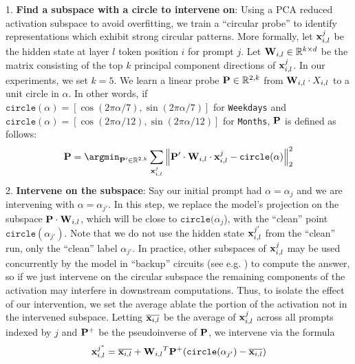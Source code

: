 \documentclass{article} %
\DeclareRobustCommand{\revOne}[1]{#1}
\theoremstyle{plain}
\theoremstyle{definition}
\newcommand{\josh}[1]{{\color{orange}{\bf Josh:} #1}}
\begin{document}
1. \textbf{Find a subspace with a circle to intervene on}: Using a PCA reduced activation subspace to avoid overfitting, we train a ``circular probe'' to identify representations which exhibit strong circular patterns. More formally, let $\x^j_{i, l}$ be the hidden state at layer $l$ token position $i$ for prompt $j$. Let $\W_{i, l} \in \mathbb{R}^{k \times d}$ be the matrix consisting of the top $k$ principal component directions of $\x^j_{i, l}$. In our experiments, we set $k = 5$. We learn a linear probe $\P \in \mathbb{R}^{2, k}$ from $\W_{i, l} \cdot X_{i, l}$ to a unit circle in $\alpha$. In other words, if $\texttt{circle}(\alpha) = [\cos(2 \pi \alpha/7), \sin(2 \pi \alpha/7)]$ for \texttt{Weekdays} and $\texttt{circle}(\alpha) = [\cos(2 \pi \alpha / 12), \sin(2 \pi \alpha / 12)]$ for \texttt{Months}, $\P$ is defined as follows:
\begin{align}
\label{eqn:circle_probe}
\P = \argmin_{ \P' \in \mathbb{R}^{2, k}} \sum_{\x^j_{i, l}}\left\lVert \P' \cdot \W_{i, l} \cdot \x^j_{i, l} - \texttt{circle}(\alpha) \right\rVert_2^2  
\end{align}
2. \textbf{Intervene on the subspace}: Say our initial prompt had $\alpha = \alpha_j$ and we are intervening with $\alpha = \alpha_{j'}$. In this step, we replace the model's projection on the subspace $\P \cdot \W_{i,l}$, which will be close to $\texttt{circle}(\alpha_j$), with the ``clean'' point $\texttt{circle}(\alpha_{j'})$. Note that we do not use the hidden state $\x^{j'}_{i, l}$ from the ``clean'' run, only the ``clean'' label $\alpha_{j'}$. \revOne{In practice, other subspaces of $\x^j_{i, l}$ may be used concurrently by the model in ``backup'' circuits (see e.g. \cite{gpt2_ioi}) to compute the answer, so if we just intervene on the circular subspace the remaining components of the activation may interfere in downstream computations. Thus, to isolate the effect of our intervention, we set the average ablate the portion of the activation not in the intervened subspace}. Letting $\overline{{\bf x}_{i, l}}$ be the average of ${\bf x}^j_{i, l}$ across all prompts indexed by $j$ and $\P^{+}$ be the pseudoinverse of $\P$, we intervene via the formula
\begin{align}
    \label{eqn:intervention}
    \x^{j^*}_{i, l} = \overline{{\bf x}_{i, l}} + {\W_{i, l}}^T\P^{+}(\texttt{circle}(\alpha_{j'}) - \overline{{\bf x}_{i, l}}) 
\end{align}

\end{document}
